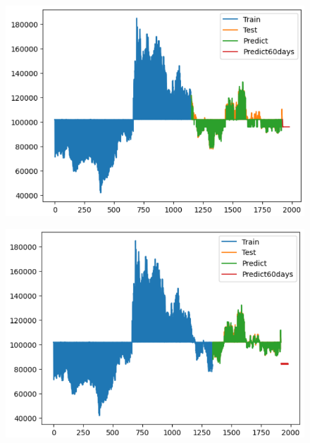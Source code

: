 \documentclass{article}
\begin{document}
\begin{multicols}{2}
\begin{figure}[H]
    \centering
    \begin{minipage}{0.15\textwidth}
    \centering
    \includegraphics[width=1\textwidth]{Image/XGBoost/LG_6_4_60.png}
   
    \label{fig:1}
    \end{minipage}%
    \begin{minipage}{0.15\textwidth}
    \centering
    \includegraphics[width=1\textwidth]{Image/XGBoost/LG_7_3_60.png}
  

\end{minipage}
\end{figure}
\end{multicols}
\end{document}
